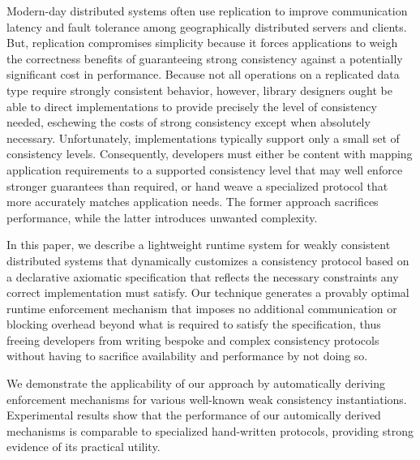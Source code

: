 
  Modern-day distributed systems often use replication to improve
  communication latency and fault tolerance among geographically
  distributed servers and clients.  But, replication compromises
  simplicity because it forces applications to weigh the correctness
  benefits of guaranteeing strong consistency against a potentially
  significant cost in performance.  Because not all operations on a
  replicated data type require strongly consistent behavior, however,
  library designers ought be able to direct implementations to provide
  precisely the level of consistency needed, eschewing the costs of
  strong consistency except when absolutely necessary.  Unfortunately,
  implementations typically support only a small set of consistency
  levels.  Consequently, developers must either be content with
  mapping application requirements to a supported consistency level
  that may well enforce stronger guarantees than required, or hand
  weave a specialized protocol that more accurately matches
  application needs.  The former approach sacrifices performance,
  while the latter introduces unwanted complexity.

  In this paper, we describe a lightweight runtime system for weakly
  consistent distributed systems that dynamically customizes a
  consistency protocol based on a declarative axiomatic specification
  that reflects the necessary constraints any correct implementation
  must satisfy.  Our technique generates a provably optimal runtime
  enforcement mechanism that imposes no additional communication or
  blocking overhead beyond what is required to satisfy the
  specification, thus freeing developers from writing bespoke and
  complex consistency protocols without having to sacrifice
  availability and performance by not doing so.

  We demonstrate the applicability of our approach by automatically
  deriving enforcement mechanisms for various well-known weak
  consistency instantiations.  Experimental results show that the
  performance of our automically derived mechanisms is comparable to
  specialized hand-written protocols, providing strong evidence of its
  practical utility.
